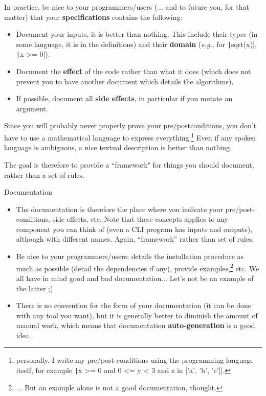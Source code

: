 \documentclass[10pt,
aspectratio=169
]{beamer}
\begin{document}
\begin{frame}
	In practice, be nice to your programmers/users (... and to future you, for that matter) that your \textbf{specifications} contains the following:\begin{itemize}
		\item Document your inputs, it is better than nothing. This include their types (in some language, it is in the definitions) and their \textbf{domain} (\textit{e.g.}, for \texttt|sqrt(x)|, \texttt|x >= 0|).
		\item Document the \textbf{effect} of the code rather than what it does (which does not prevent you to have another document which details the algorithms).
		\item If possible, document all \textbf{side effects}, in particular if you mutate an argument.
	\end{itemize}
	
	Since you will probably never properly prove your pre/postconditions, you don't have to use a mathematical language to express everything.\footnote{personally, I write my pre/post-conditions using the programming language itself, for example \texttt|x >= 0 and 0 <= y < 3 and z in ['a', 'b', 'c']|.} Even if any spoken language is ambiguous, a nice textual description is better than nothing.
	
	The goal is therefore to provide a ``framework" for things you should document, rather than a set of rules.
\end{frame}

\begin{frame}{Documentation}
	\begin{itemize}
		\item The documentation is therefore the place where you indicate your pre/post-conditions, side effects, etc. Note that these concepts applies to any component you can think of (even a CLI program has inputs and outputs), although with different names. Again, ``framework'' rather than set of rules.
		\item Be nice to your programmers/users: details the installation procedure as much as possible (detail the dependencies if any), provide examples,\footnote{... But an example alone is not a good documentation, thought.} etc. We all have in mind good and bad documentation... Let's not be an example of the latter ;)
		\item There is no convention for the form of your documentation (it can be done with any tool you want), but it is generally better to diminish the amount of manual work, which means that documentation \textbf{auto-generation} is a good idea.
	\end{itemize}
\end{frame}
\end{document}
